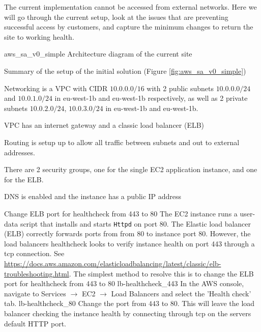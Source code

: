 

The current implementation cannot be accessed from external networks. Here we will go through the current setup, look at the issues that are preventing successful access by customers, and capture the minimum changes to return the site to working health.

\architecture
{aws_sa_v0_simple}
{Architecture diagram of the current site}
	\FloatBarrier
	
\changes
{Summary of the setup of the initial solution (Figure \ref{fig:aws_sa_v0_simple})}
{
	\item Networking is a VPC with CIDR $10.0.0.0/16$ with 2 public subnets $10.0.0.0/24$ and  $10.0.1.0/24$ in eu-west-1b and eu-west-1b respectively, as well as 2 private subnets $10.0.2.0/24$, $10.0.3.0/24$ in eu-west-1b and eu-west-1b. 

	\item VPC has an internet gateway and a classic load balancer (ELB)
	
	\item Routing is setup up to allow all traffic between subnets and out to external addresses.
	
	\item There are 2 security groups, one for the single EC2 application instance, and one for the ELB.
	
	\item DNS is enabled and the instance has a public IP address
}




{Change ELB port for healthcheck from 443 to 80}
{
	The EC2 instance runs a user-data script that installs and starts \texttt{Httpd} on port $80$. The Elastic load balancer (ELB) correctly forwards ports
	from from 80 to instance port $80$. However, the load balancers healthcheck looks to verify instance health on port 443 through a tcp connection. See 	\url{https://docs.aws.amazon.com/elasticloadbalancing/latest/classic/elb-troubleshooting.html}. The simplest method to resolve this is to change the ELB port for healthcheck from 443 to 80
}
{
	\imagefigsinglebox
	{lb-healthcheck_443}
	{In the AWS console, navigate to Services  $\rightarrow$ EC2  $\rightarrow$ Load Balancers and select the 'Health check' tab.}
	\imagefigsinglebox
	{lb-healthcheck_80}
	{Change the port from $443$ to $80$. This will leave the load balancer checking the instance health by connecting through tcp on the servers default HTTP port.}
}
\FloatBarrier


